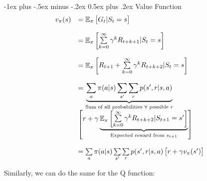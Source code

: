 \documentclass[10pt,landscape]{article}
\makeatletter
\renewcommand{\section}{\@startsection{section}{1}{0mm}%
                                {-1ex plus -.5ex minus -.2ex}%
                                {0.5ex plus .2ex}%
                                {\normalfont\large\bfseries}}
\makeatother
\begin{document}
\begin{multicols}{3}
\section{Value Function}
\begin{equation}
\begin{array}{l l}
v_{\pi}(s) &= \mathbb{E}_{\pi}\begin{bmatrix}G_t | S_t = s\end{bmatrix} \\
\\
&=  \mathbb{E}_{\pi}\begin{bmatrix}\sum\limits_{k = 0}^{\infty} \gamma^kR_{t + k + 1} | S_t = s \end{bmatrix} \\
\\
&= \mathbb{E}_{\pi}\begin{bmatrix}R_{t + 1} + \sum\limits_{k = 0}^{\infty} \gamma^k R_{t + k + 2} | S_t = s \end{bmatrix} \\
\\
&= \underbrace{\sum\limits_{a} \pi(a | s) \sum\limits_{s'}\sum\limits_{r} p(s', r | s, a)}_{\text{Sum of all probabilities $\forall$ possible $r$}} \\
& \begin{bmatrix} r + \gamma \underbrace{\mathbb{E}_{\pi}\begin{bmatrix} \sum\limits_{k = 0}^{\infty} \gamma^k R_{t + k + 2} | S_{t + 1} = s' \end{bmatrix}}_{\text{Expected reward from } s_{t + 1}} \end{bmatrix} \\
\\
&= \sum\limits_{a} \pi(a | s) \sum\limits_{s'}\sum\limits_{r} p(s', r | s, a)\begin{bmatrix} r + \gamma v_{\pi}(s')
\end{bmatrix}
\end{array}
\label{eq: value_bellman}
\end{equation}

Similarly, we can do the same for the Q function:


\end{multicols}
\end{document}
